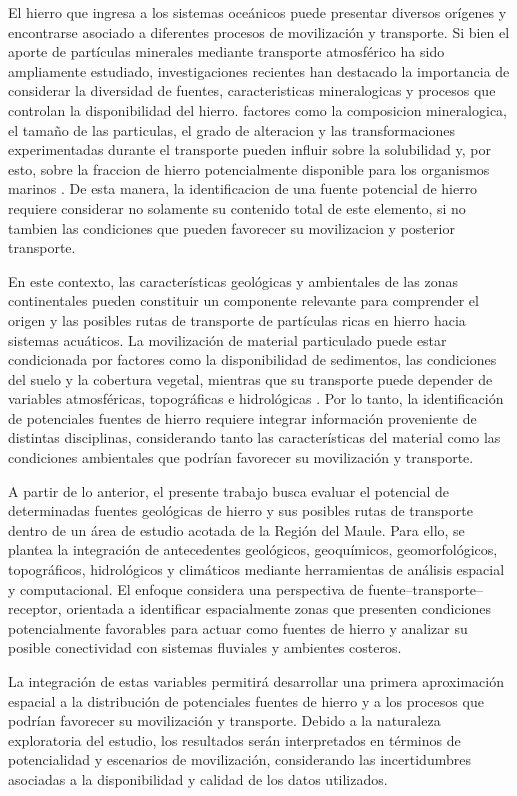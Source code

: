 El hierro que ingresa a los sistemas oceánicos puede presentar diversos orígenes y encontrarse asociado a diferentes procesos de movilización y transporte. Si bien el aporte de partículas minerales mediante transporte atmosférico ha sido ampliamente estudiado, investigaciones recientes han destacado la importancia de considerar la diversidad de fuentes, caracteristicas mineralogicas y procesos que controlan la disponibilidad del hierro. factores como la composicion mineralogica, el tamaño de las particulas, el grado de alteracion y las transformaciones experimentadas durante el transporte pueden influir sobre la solubilidad y, por esto, sobre la fraccion de hierro potencialmente disponible para los organismos marinos \cite{Zan2025}. De esta manera, la identificacion de una fuente potencial de hierro requiere considerar no solamente su contenido total de este elemento, si no tambien las condiciones que pueden favorecer su movilizacion y posterior transporte.

En este contexto, las características geológicas y ambientales de las zonas continentales pueden constituir un componente relevante para comprender el origen y las posibles rutas de transporte de partículas ricas en hierro hacia sistemas acuáticos. La movilización de material particulado puede estar condicionada por factores como la disponibilidad de sedimentos, las condiciones del suelo y la cobertura vegetal, mientras que su transporte puede depender de variables atmosféricas, topográficas e hidrológicas \citep{Zan2025}. Por lo tanto, la identificación de potenciales fuentes de hierro requiere integrar información proveniente de distintas disciplinas, considerando tanto las características del material como las condiciones ambientales que podrían favorecer su movilización y transporte.

A partir de lo anterior, el presente trabajo busca evaluar el potencial de determinadas fuentes geológicas de hierro y sus posibles rutas de transporte dentro de un área de estudio acotada de la Región del Maule. Para ello, se plantea la integración de antecedentes geológicos, geoquímicos, geomorfológicos, topográficos, hidrológicos y climáticos mediante herramientas de análisis espacial y computacional. El enfoque considera una perspectiva de fuente--transporte--receptor, orientada a identificar espacialmente zonas que presenten condiciones potencialmente favorables para actuar como fuentes de hierro y analizar su posible conectividad con sistemas fluviales y ambientes costeros.

La integración de estas variables permitirá desarrollar una primera aproximación espacial a la distribución de potenciales fuentes de hierro y a los procesos que podrían favorecer su movilización y transporte. Debido a la naturaleza exploratoria del estudio, los resultados serán interpretados en términos de potencialidad y escenarios de movilización, considerando las incertidumbres asociadas a la disponibilidad y calidad de los datos utilizados.

